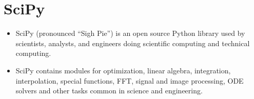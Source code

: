 \documentclass[Pydata.tex]{subfiles}
\begin{document}
 

\section{SciPy}
\Large
\begin{itemize}
\item SciPy (pronounced “Sigh Pie”) is an open source Python library used by scientists, analysts, and engineers doing scientific computing and technical computing.

\item SciPy contains modules for optimization, linear algebra, integration, interpolation, special functions, FFT, signal and image processing, ODE solvers and other tasks common in science and engineering.
\end{itemize}
\end{document}
